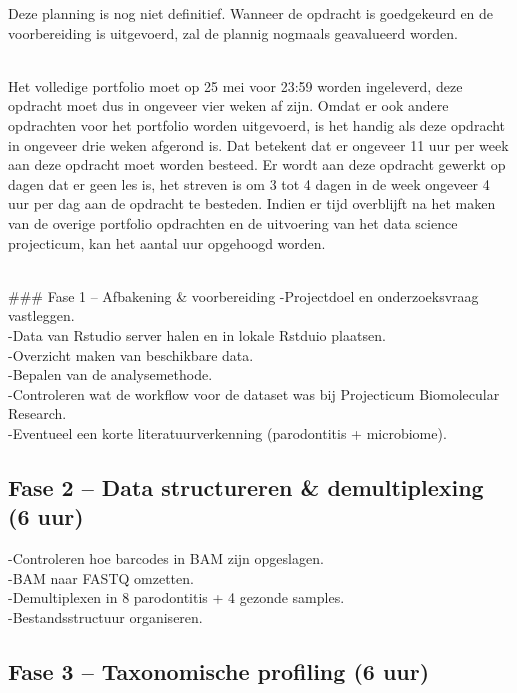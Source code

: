 \documentclass[
]{book}
\begin{document}
Deze planning is nog niet definitief. Wanneer de opdracht is goedgekeurd en de voorbereiding is uitgevoerd, zal de plannig nogmaals geavalueerd worden.\\
\strut \\
Het volledige portfolio moet op 25 mei voor 23:59 worden ingeleverd, deze opdracht moet dus in ongeveer vier weken af zijn. Omdat er ook andere opdrachten voor het portfolio worden uitgevoerd, is het handig als deze opdracht in ongeveer drie weken afgerond is. Dat betekent dat er ongeveer 11 uur per week aan deze opdracht moet worden besteed. Er wordt aan deze opdracht gewerkt op dagen dat er geen les is, het streven is om 3 tot 4 dagen in de week ongeveer 4 uur per dag aan de opdracht te besteden. Indien er tijd overblijft na het maken van de overige portfolio opdrachten en de uitvoering van het data science projecticum, kan het aantal uur opgehoogd worden.\\
\strut \\
\#\#\# Fase 1 -- Afbakening \& voorbereiding
-Projectdoel en onderzoeksvraag vastleggen.\\
-Data van Rstudio server halen en in lokale Rstduio plaatsen.\\
-Overzicht maken van beschikbare data.\\
-Bepalen van de analysemethode.\\
-Controleren wat de workflow voor de dataset was bij Projecticum Biomolecular Research.\\
-Eventueel een korte literatuurverkenning (parodontitis + microbiome).\\

\subsection{Fase 2 -- Data structureren \& demultiplexing (6 uur)}\label{fase-2-data-structureren-demultiplexing-6-uur}

-Controleren hoe barcodes in BAM zijn opgeslagen.\\
-BAM naar FASTQ omzetten.\\
-Demultiplexen in 8 parodontitis + 4 gezonde samples.\\
-Bestandsstructuur organiseren.\\

\subsection{Fase 3 -- Taxonomische profiling (6 uur)}\label{fase-3-taxonomische-profiling-6-uur}
\end{document}
